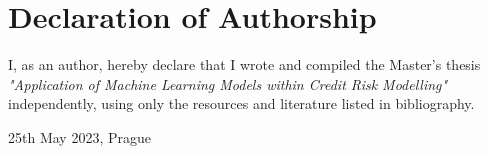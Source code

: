 \vfill

\vglue 14cm

\section*{Declaration of Authorship}
I, as an author, hereby declare that I wrote and compiled the Master's thesis {\it{"Application of Machine Learning Models within Credit Risk Modelling"}} independently, using only the resources and literature listed in bibliography.

\bigskip 

\vspace{0.5cm}


\begin{flushleft}
25th May 2023, Prague 
\end{flushleft}
\vspace{-0.5cm}
\begin{flushright}
\AuthorDP
\end{flushright}

